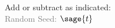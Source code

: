 \documentclass{article}%
\begin{document}

\noindent Add or subtract as indicated: \\
\textcolor{gray}{Random Seed: $\sage{t}$}


\begin{multicols}{3}
\begin{enumerate}
\end{enumerate}
\end{multicols}


\vfill
\newpage


\begin{multicols}{3}
\begin{enumerate}
\end{enumerate}
\end{multicols}
\end{document}
